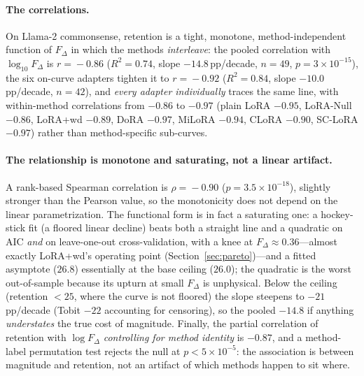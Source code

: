 \documentclass[11pt]{article}
\newcommand{\dw}{F_{\Delta}}
\begin{document}
\paragraph{The correlations.} On Llama-2 commonsense, retention is a tight,
monotone, method-independent function of $\dw$ in which the methods
\emph{interleave}: the pooled correlation with $\log_{10}\dw$ is $r\!=\!-0.86$
($R^2\!=\!0.74$, slope $-14.8$\,pp/decade, $n\!=\!49$,
$p\!=\!3\!\times\!10^{-15}$), the six on-curve adapters tighten it to
$r\!=\!-0.92$ ($R^2\!=\!0.84$, slope $-10.0$\,pp/decade, $n\!=\!42$), and
\emph{every adapter individually} traces the same line, with within-method
correlations from $-0.86$ to $-0.97$ (plain LoRA $-0.95$, LoRA-Null $-0.86$,
LoRA{+}wd $-0.89$, DoRA $-0.97$, MiLoRA $-0.94$, CLoRA $-0.90$, SC-LoRA $-0.97$)
rather than method-specific sub-curves.

\paragraph{The relationship is monotone and saturating, not a linear artifact.} A
rank-based Spearman correlation is $\rho\!=\!-0.90$ ($p\!=\!3.5\times10^{-18}$),
slightly stronger than the Pearson value, so the monotonicity does not depend on the
linear parametrization. The functional form is in fact a saturating one: a
hockey-stick fit (a floored linear decline) beats both a straight line and a
quadratic on AIC \emph{and} on leave-one-out cross-validation, with a knee at
$\dw\!\approx\!0.36$---almost exactly LoRA{+}wd's operating point
(Section~\ref{sec:pareto})---and a fitted asymptote ($26.8$) essentially at the
base ceiling ($26.0$);
the quadratic is the worst out-of-sample because its upturn at small $\dw$ is
unphysical. Below the ceiling (retention $<25$, where the curve is not floored) the
slope steepens to $-21$\,pp/decade (Tobit $-22$ accounting for censoring), so the
pooled $-14.8$ if anything \emph{understates} the true cost of magnitude. Finally,
the partial correlation of retention with $\log\dw$ \emph{controlling for method
identity} is $-0.87$, and a method-label permutation test rejects the null at
$p\!<\!5\times10^{-5}$: the association is between magnitude and retention, not an
artifact of which methods happen to sit where.
\end{document}
